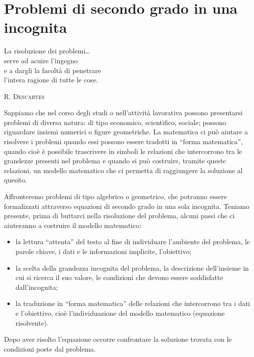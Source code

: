 % 

\section{Problemi di secondo grado in una incognita}
\label{sec:eq2gr_problemi}

\epigraph{La risoluzione dei problemi\dots \\
serve ad acuire l'ingegno \\
e a dargli la facoltà di penetrare\\
l'intera ragione di tutte le cose.}{{\scshape{R. Descartes}}}

Sappiamo che nel corso degli studi o nell'attività lavorativa possono 
presentarsi problemi di diversa natura: di tipo economico, scientifico, 
sociale; possono riguardare insiemi numerici o figure geometriche. La 
matematica ci può aiutare a risolvere i problemi quando essi possono essere 
tradotti in ``forma matematica'', quando cioè è possibile trascrivere in 
simboli le relazioni che intercorrono tra le grandezze presenti nel 
problema e quando si può costruire, tramite queste relazioni, un modello 
matematico che ci permetta di raggiungere la soluzione al quesito.

Affronteremo problemi di tipo algebrico o geometrico, che potranno essere 
formalizzati attraverso equazioni di secondo grado in una sola incognita.
Teniamo presente, prima di buttarci nella risoluzione del problema, alcuni 
passi che ci aiuteranno a costruire il modello matematico:

\begin{itemize}[nosep]
\item la lettura ``attenta'' del testo al fine di individuare l'ambiente 
del problema, le parole chiave, i dati e le informazioni implicite, 
l'obiettivo;
\item la scelta della grandezza incognita del problema, la descrizione 
dell'insieme in cui si ricerca il suo valore, le condizioni che devono 
essere soddisfatte dall'incognita;
\item la traduzione in ``forma matematica'' delle relazioni che 
intercorrono tra i dati e l'obiettivo, cioè l'individuazione del modello 
matematico (equazione risolvente).
\end{itemize}
Dopo aver risolto l'equazione occorre confrontare la soluzione trovata 
con le condizioni poste dal problema.


